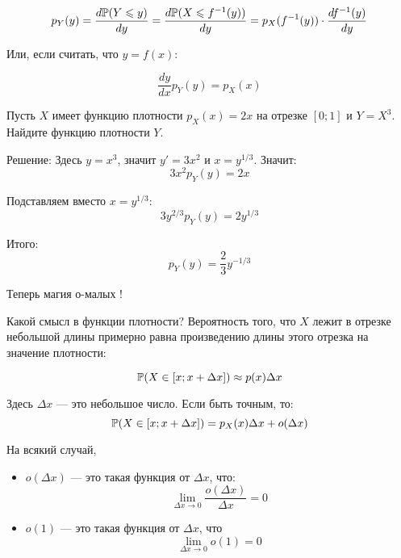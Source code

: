 \[ p_{Y}(y)=\frac{d\P(Y\leq y)}{dy}=\frac{d\P(X\leq f^{-1}(y))}{dy}=p_{X}(f^{-1}(y))\cdot \frac{df^{-1}(y)}{dy} \]

Или, если считать, что $ y=f(x) $:

\begin{equation}
\frac{dy}{dx}p_{Y}(y)=p_{X}(x)
\end{equation}

\begin{myex} Пусть $ X $ имеет функцию плотности $ p_{X}(x)=2x $ на отрезке $ [0;1] $ и $ Y=X^{3} $. Найдите функцию плотности $ Y $.

Решение: Здесь $ y=x^{3} $, значит $ y'=3x^{2} $ и $ x=y^{1/3} $. Значит:
\begin{equation}
3x^{2}p_{Y}(y)=2x
\end{equation}

Подставляем вместо $ x=y^{1/3} $:
\begin{equation}
3y^{2/3}p_{Y}(y)=2y^{1/3}
\end{equation}

Итого:
\begin{equation}
p_{Y}(y)=\frac{2}{3}y^{-1/3}
\end{equation}
\end{myex}

Теперь магия о-малых !

Какой смысл в функции плотности? Вероятность того, что $ X $ лежит в отрезке небольшой длины примерно равна произведению длины этого отрезка на значение плотности:

\begin{equation}
\P(X\in [x;x+\Delta x])\approx p(x)\Delta x
\end{equation}

Здесь $ \Delta x $ — это небольшое число. Если быть точным, то:
\begin{equation}
\P(X\in [x;x+\Delta x])=p_{X}(x)\Delta x+o(\Delta x)
\end{equation}


На всякий случай,
\begin{itemize}
\item $ o(\Delta x) $ — это такая функция от $ \Delta x $, что:
\begin{equation}
\lim_{\Delta x\to 0} \frac{o(\Delta x)}{\Delta x}=0
\end{equation}
\item $ o(1) $ — это такая функция от $ \Delta x $, что
\begin{equation}
\lim_{\Delta x \to 0} o(1)=0
\end{equation}


\end{itemize}



